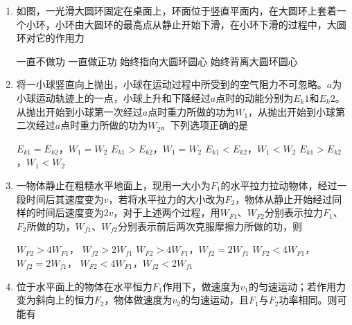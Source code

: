 \begin{enumerate}[leftmargin=0em]
\item 
{}
如图，一光滑大圆环固定在桌面上，环面位于竖直平面内，在大圆环上套着一个小环，小环由大圆环的最高点从静止开始下滑，在小环下滑的过程中，大圆环对它的作用力  

\begin{minipage}[h!]{0.7\linewidth}
\vspace{0.3em}
\fourchoices
{一直不做功}
{一直做正功}
{始终指向大圆环圆心}
{始终背离大圆环圆心}
\vspace{0.3em}
\end{minipage}
\hfill
\begin{minipage}[h!]{0.3\linewidth}
\flushright
\vspace{0.3em}

\vspace{0.3em}
\end{minipage}



\item 
{}
将一小球竖直向上抛出，小球在运动过程中所受到的空气阻力不可忽略。$ a $为小球运动轨迹上的一点，小球上升和下降经过$ a $点时的动能分别为$ E_{k} 1 $和$ E_{k} 2 $。从抛出开始到小球第一次经过$ a $点时重力所做的功为$ W_{1} $，从抛出开始到小球第二次经过$ a $点时重力所做的功为$ W_{2} $。下列选项正确的是  

\fourchoices
{$ E_{k1} = E_{k2} $，$ W_1=W_2 $ }
{$ E_{k1} > E_{k2} $，$ W_1=W_2 $}
{$ E_{k1} < E_{k2} $，$ W_1<W_2 $ }
{$ E_{k1} > E_{k2} $，$ W_1<W_2 $}



\item
{}
一物体静止在粗糙水平地面上，现用一大小为$ F_{1} $的水平拉力拉动物体，经过一段时间后其速度变为$ v $，若将水平拉力的大小改为$ F_{2} $，物体从静止开始经过同样的时间后速度变为$ 2v $，对于上述两个过程，用$ W_{F1} $、$ W_{F2} $分别表示拉力$ F_{1} $、$ F_{2} $所做的功，$ W_{f1} $、$ W_{f2} $分别表示前后两次克服摩擦力所做的功，则  

\fourchoices
{$ W_{F2}>4W_{F1} $， $ W_{f2}>2W_{f1} $}
{$ W_{F2}>4W_{F1} $，$ W_{f2}=2W_{f1} $}
{$ W_{F2}<4W_{F1} $，$ W_{f2}=2W_{f1} $，}
{$ W_{F2}<4W_{F1} $，$ W_{f2}<2W_{f1} $}




\item 
{}
位于水平面上的物体在水平恒力$ F_{1} $作用下，做速度为$ v_{1} $的匀速运动；若作用力变为斜向上的恒力$ F_{2} $，物体做速度为$ v_{2} $的匀速运动，且$ F_{1} $与$ F_{2} $功率相同。则可能有  
\begin{figure}[h!]
\centering

\end{figure}



\end{enumerate}
